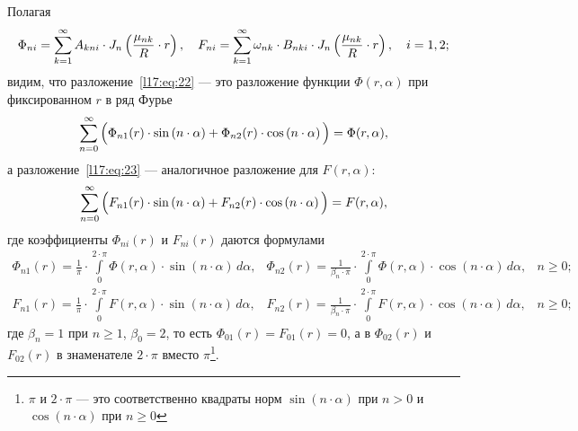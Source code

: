 Полагая 
\begin{equation}\label{l17:eq:24}
	\hfill\Phi_{ni}=\sum\limits_{k=1}^{\infty}A_{kni}\cdot J_{n}\left(\frac{\mu_{nk}}{R}\cdot r\right),\quad F_{ni}=\sum\limits_{k=1}^{\infty}\omega_{nk}\cdot B_{nki}\cdot J_{n}\left(\frac{\mu_{nk}}{R}\cdot r\right),\quad i=1,2;\hfill
\end{equation}
видим, что разложение~\eqref{l17:eq:22} --- это разложение функции $\Phi(r,\alpha)$ при фиксированном $r$ в ряд Фурье
\begin{equation*}
	\hfill\sum\limits_{n=0}^{\infty}\Big(\Phi_{n1}(r)\cdot\sin\left(n\cdot\alpha\right)+\Phi_{n2}(r)\cdot\cos\left(n\cdot\alpha\right)\Big)=\Phi(r,\alpha),\hfill
\end{equation*}
а разложение~\eqref{l17:eq:23} --- аналогичное разложение для $F(r,\alpha)$:
\begin{equation*}
	\hfill\sum\limits_{n=0}^{\infty}\Big(F_{n1}(r)\cdot\sin\left(n\cdot\alpha\right)+F_{n2}(r)\cdot\cos\left(n\cdot\alpha\right)\Big)=F(r,\alpha),\hfill
\end{equation*}
где коэффициенты $\Phi_{ni}(r)$ и $F_{ni}(r)$ даются формулами
\begin{equation}\label{l17:eq:25}
	\begin{array}{ccc}
		\displaystyle\Phi_{n1}(r)=\frac{1}{\pi}\cdot\int\limits_{0}^{2\cdot\pi}\Phi(r,\alpha)\cdot\sin\left(n\cdot\alpha\right)\,d\alpha,&\displaystyle\Phi_{n2}(r)=\frac{1}{\beta_n\cdot\pi}\cdot\int\limits_{0}^{2\cdot\pi}\Phi(r,\alpha)\cdot\cos\left(n\cdot\alpha\right)\,d\alpha,&n\geqslant0;\\[18pt]
		\displaystyle F_{n1}(r)=\frac{1}{\pi}\cdot\int\limits_{0}^{2\cdot\pi}F(r,\alpha)\cdot\sin\left(n\cdot\alpha\right)\,d\alpha,&\displaystyle F_{n2}(r)=\frac{1}{\beta_n\cdot\pi}\cdot\int\limits_{0}^{2\cdot\pi}F(r,\alpha)\cdot\cos\left(n\cdot\alpha\right)\,d\alpha,&n\geqslant0;
	\end{array}
\end{equation}
где $\beta_n=1$ при $n\geqslant1$, $\beta_0=2$, то есть $\Phi_{01}(r)=F_{01}(r)=0$, а в $\Phi_{02}(r)$ и $F_{02}(r)$ в знаменателе $2\cdot\pi$ вместо $\pi$\footnote{$\pi$ и $2\cdot\pi$ --- это соответственно квадраты норм $\sin(n\cdot\alpha)$ при $n>0$ и $\cos(n\cdot\alpha)$ при $n\geqslant0$}.

